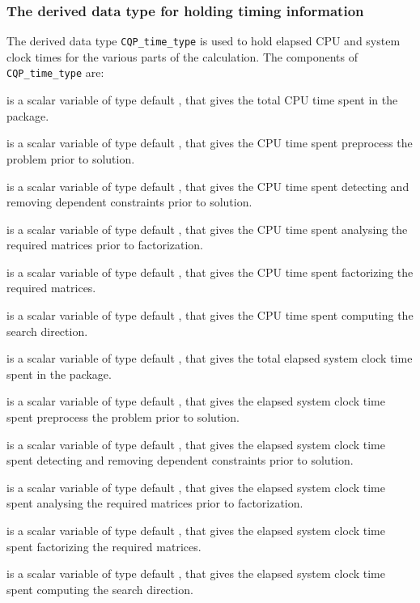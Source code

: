 \documentclass{galahad}
\newcommand{\packagename}{CQP}
\begin{document}
\subsubsection{The derived data type for holding timing
 information}\label{typetime}
The derived data type
{\tt \packagename\_time\_type}
is used to hold elapsed CPU and system clock times for the various parts of
the calculation. The components of
{\tt \packagename\_time\_type}
are:
\begin{description}
 is a scalar variable of type default \realdp, that gives
 the total CPU time spent in the package.

 is a scalar variable of type default \realdp, that gives
 the CPU time spent preprocess the problem prior to solution.

 is a scalar variable of type default \realdp, that gives
 the CPU time spent detecting and removing dependent constraints prior
to solution.

 is a scalar variable of type default \realdp, that gives
 the CPU time spent analysing the required matrices prior to factorization.

 is a scalar variable of type default \realdp, that gives
 the CPU time spent factorizing the required matrices.

 is a scalar variable of type default \realdp, that gives
 the CPU time spent computing the search direction.

 is a scalar variable of type default \realdp, that gives
 the total elapsed system clock time spent in the package.

 is a scalar variable of type default \realdp, that gives
 the elapsed system clock time spent preprocess the problem prior to solution.

 is a scalar variable of type default \realdp,
that gives  the elapsed system clock time spent detecting and removing
dependent constraints prior to solution.

 is a scalar variable of type default \realdp, that gives
 the elapsed system clock time spent analysing the required matrices prior to
factorization.

 is a scalar variable of type default \realdp, that gives
 the elapsed system clock time spent factorizing the required matrices.

 is a scalar variable of type default \realdp, that gives
 the elapsed system clock time spent computing the search direction.

\end{description}
\end{document}
